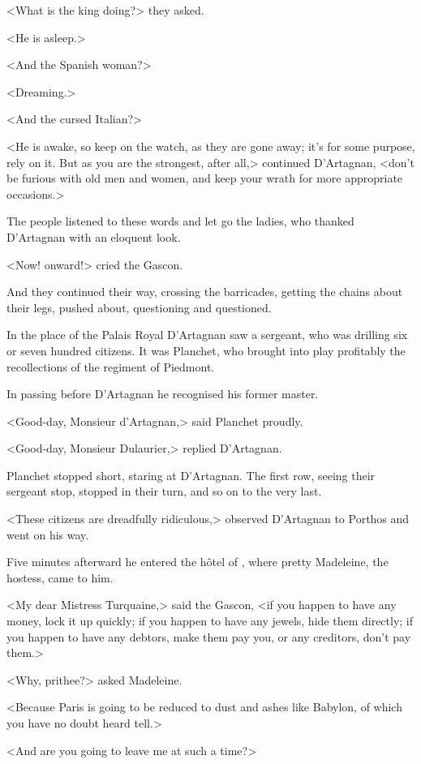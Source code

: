 <What is the king doing?> they asked.

<He is asleep.>

<And the Spanish woman?>

<Dreaming.>

<And the cursed Italian?>

<He is awake, so keep on the watch, as they are gone away; it's for some purpose, rely on it. But as you are the strongest, after all,> continued D'Artagnan, <don't be furious with old men and women, and keep your wrath for more appropriate occasions.>

The people listened to these words and let go the ladies, who thanked D'Artagnan with an eloquent look.

<Now! onward!> cried the Gascon.

And they continued their way, crossing the barricades, getting the chains about their legs, pushed about, questioning and questioned.

In the place of the Palais Royal D'Artagnan saw a sergeant, who was drilling six or seven hundred citizens. It was Planchet, who brought into play profitably the recollections of the regiment of Piedmont.

In passing before D'Artagnan he recognised his former master.

<Good-day, Monsieur d'Artagnan,> said Planchet proudly.

<Good-day, Monsieur Dulaurier,> replied D'Artagnan.

Planchet stopped short, staring at D'Artagnan. The first row, seeing their sergeant stop, stopped in their turn, and so on to the very last.

<These citizens are dreadfully ridiculous,> observed D'Artagnan to Porthos and went on his way.

Five minutes afterward he entered the hôtel of , where pretty Madeleine, the hostess, came to him.

<My dear Mistress Turquaine,> said the Gascon, <if you happen to have any money, lock it up quickly; if you happen to have any jewels, hide them directly; if you happen to have any debtors, make them pay you, or any creditors, don't pay them.>

<Why, prithee?> asked Madeleine.

<Because Paris is going to be reduced to dust and ashes like Babylon, of which you have no doubt heard tell.>

<And are you going to leave me at such a time?>

